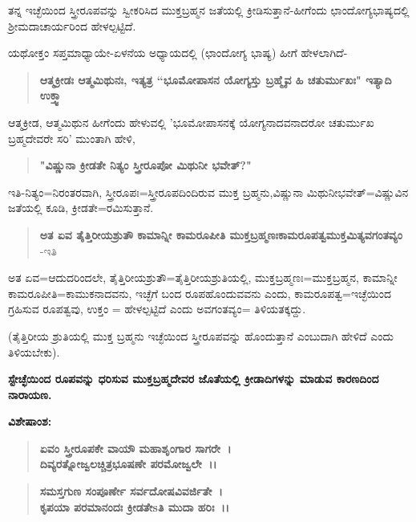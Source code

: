 ತನ್ನ ಇಚ್ಛೆಯಿಂದ ಸ್ತ್ರೀರೂಪವನ್ನು ಸ್ವೀಕರಿಸಿದ ಮುಕ್ತಬ್ರಹ್ಮನ ಜತೆಯಲ್ಲಿ ಕ್ರೀಡಿಸುತ್ತಾನೆ-ಹೀಗೆಂದು ಛಾಂದೋಗ್ಯಭಾಷ್ಯದಲ್ಲಿ ಶ‍್ರೀಮದಾಚಾರ್ಯರಿಂದ ಹೇಳಲ್ಪಟ್ಟಿದೆ.

ಯಥೋಕ್ತಂ ಸಪ್ತಮಾಧ್ಯಾಯೇ-ಏಳನೆಯ ಅಧ್ಯಾಯದಲ್ಲಿ (ಛಾಂದೋಗ್ಯ ಭಾಷ್ಯ) ಹೀಗೆ ಹೇಳಲಾಗಿದೆ-

\begin{verse}
\textbf{ಆತ್ಮಕ್ರೀಡಃ ಆತ್ಮಮಿಥುನಃ, ಇತ್ಯತ್ರ “ಭೂಮೋಪಾಸನ ಯೋಗ್ಯಸ್ತು ಬ್ರಹ್ಮೈವ ಹಿ ಚತುರ್ಮುಖಃ" ಇತ್ಯಾದಿ ಉಕ್ತ್ವಾ}
\end{verse}

ಆತ್ಮಕ್ರೀಡ, ಆತ್ಮಮಿಥುನ ಹೀಗೆಂದು ಹೇಳುವಲ್ಲಿ 'ಭೂಮೋಪಾಸನಕ್ಕೆ ಯೋಗ್ಯನಾದವನಾದರೋ ಚತುರ್ಮುಖ ಬ್ರಹ್ಮದೇವರೇ ಸರಿ' ಮುಂತಾಗಿ ಹೇಳಿ,

\begin{verse}
\textbf{"ವಿಷ್ಣುನಾ ಕ್ರೀಡತೇ ನಿತ್ಯಂ ಸ್ತ್ರೀರೂಪೋ ಮಿಥುನೀ ಭವೇತ್?"}
\end{verse}

ಇತಿ-ನಿತ್ಯಂ=ನಿರಂತರವಾಗಿ, ಸ್ತ್ರೀರೂಪಃ=ಸ್ತ್ರೀರೂಪದಿಂದಿರುವ ಮುಕ್ತ ಬ್ರಹ್ಮನು,\break ವಿಷ್ಣುನಾ ಮಿಥುನೀಭವೇತ್=ವಿಷ್ಣುವಿನ ಜತೆಯಲ್ಲಿ ಕೂಡಿ, ಕ್ರೀಡತೇ=ರಮಿಸುತ್ತಾನೆ.

\begin{verse}
\textbf{ಅತ ಏವ ತೈತ್ತಿರೀಯಶ್ರುತೌ ಕಾಮಾನ್ನೀ ಕಾಮರೂಪೀತಿ ಮುಕ್ತಬ್ರಹ್ಮಣಃ\break ಕಾಮರೂಪತ್ವಮುಕ್ತಮಿತ್ಯವಗಂತವ್ಯಂ} -ಇತಿ
\end{verse}

ಅತ ಏವ=ಆದುದರಿಂದಲೇ, ತೈತ್ತಿರೀಯಶ್ರುತೌ=ತೈತ್ತಿರೀಯಶ್ರುತಿಯಲ್ಲಿ, ಮುಕ್ತಬ್ರಹ್ಮಣಃ\-=ಮುಕ್ತಬ್ರಹ್ಮನ, ಕಾಮಾನ್ನೀ ಕಾಮರೂಪೀತಿ=ಕಾಮುಕನಾದವನು, ಇಚ್ಛೆಗೆ ಬಂದ ರೂಪಹೊಂದುವವನು ಎಂದು, ಕಾಮರೂಪತ್ವ=ಇಚ್ಛೆಯಿಂದ ಗ್ರಹಿಸುವ ರೂಪತ್ವವು, ಉಕ್ತಂ = ಹೇಳಲ್ಪಟ್ಟಿದೆ ಎಂದು ಅವಗಂತವ್ಯಂ= ತಿಳಿಯತಕ್ಕದ್ದು.

(ತೈತ್ತಿರೀಯ ಶ್ರುತಿಯಲ್ಲಿ ಮುಕ್ತ ಬ್ರಹ್ಮನು ಇಚ್ಛೆಯಿಂದ ಸ್ತ್ರೀರೂಪವನ್ನು ಹೊಂದುತ್ತಾನೆ ಎಂಬುದಾಗಿ ಹೇಳಿದೆ ಎಂದು ತಿಳಿಯಬೇಕು).

\begin{center}
\textbf{ಸ್ಟೇಚ್ಛೆಯಿಂದ ರೂಪವನ್ನು ಧರಿಸುವ ಮುಕ್ತಬ್ರಹ್ಮದೇವರ ಜೊತೆಯಲ್ಲಿ ಕ್ರೀಡಾದಿಗಳನ್ನು ಮಾಡುವ ಕಾರಣದಿಂದ ನಾರಾಯಣ.}
\end{center}

\noindent
\textbf{ವಿಶೇಷಾಂಶ:\enginline{-}}

\begin{verse}
\textbf{ಏವಂ ಸ್ತ್ರೀರೂಪಕೇ ವಾಯೌ ಮಹಾಶೃಂಗಾರ ಸಾಗರೇ~।}\\\textbf{ದಿವ್ಯರತ್ನೋಜ್ವಲಚ್ಚಿತ್ರಭೂಷಣೇ ಪರಮೋಜ್ವಲೇ~।।}
\end{verse}

\begin{verse}
\textbf{ಸಮಸ್ತಗುಣ ಸಂಪೂರ್ಣೇ ಸರ್ವದೋಷವಿವರ್ಜಿತೇ~।}\\\textbf{ಕೃಪಯಾ ಪರಮಾನಂದಃ ಕ್ರೀಡತೇsತಿ ಮುದಾ ಹರಿಃ~।।}
\end{verse}

